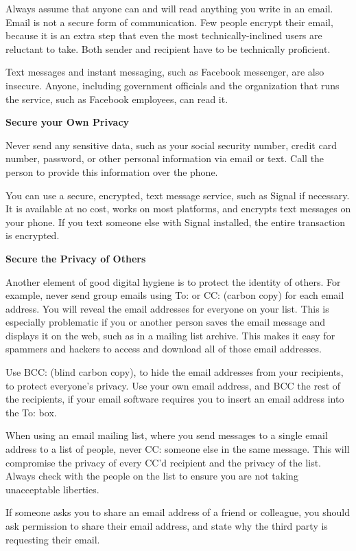 \documentclass[
]{book}
\theoremstyle{definition}
\theoremstyle{definition}
\theoremstyle{definition}
\theoremstyle{definition}
\theoremstyle{remark}
\begin{document}
Always assume that anyone can and will read anything you write in an email. Email is not a secure form of communication. Few people encrypt their email, because it is an extra step that even the most technically-inclined users are reluctant to take. Both sender and recipient have to be technically proficient.

Text messages and instant messaging, such as Facebook messenger, are also insecure. Anyone, including government officials and the organization that runs the service, such as Facebook employees, can read it.

\textbf{Secure your Own Privacy}

Never send any sensitive data, such as your social security number, credit card number, password, or other personal information via email or text. Call the person to provide this information over the phone.

You can use a secure, encrypted, text message service, such as Signal if necessary. It is available at no cost, works on most platforms, and encrypts text messages on your phone. If you text someone else with Signal installed, the entire transaction is encrypted.

\textbf{Secure the Privacy of Others}

Another element of good digital hygiene is to protect the identity of others. For example, never send group emails using To: or CC: (carbon copy) for each email address. You will reveal the email addresses for everyone on your list. This is especially problematic if you or another person saves the email message and displays it on the web, such as in a mailing list archive. This makes it easy for spammers and hackers to access and download all of those email addresses.

Use BCC: (blind carbon copy), to hide the email addresses from your recipients, to protect everyone's privacy. Use your own email address, and BCC the rest of the recipients, if your email software requires you to insert an email address into the To: box.

When using an email mailing list, where you send messages to a single email address to a list of people, never CC: someone else in the same message. This will compromise the privacy of every CC'd recipient and the privacy of the list. Always check with the people on the list to ensure you are not taking unacceptable liberties.

If someone asks you to share an email address of a friend or colleague, you should ask permission to share their email address, and state why the third party is requesting their email.
\end{document}
